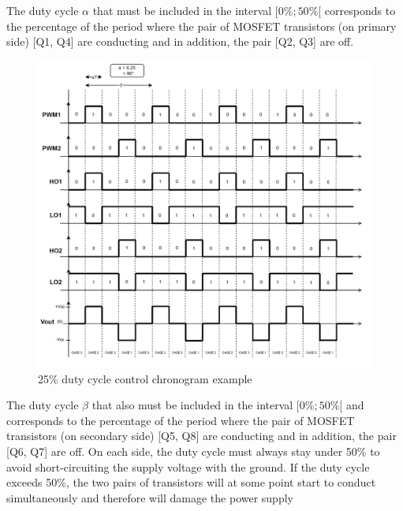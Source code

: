 \documentclass[conference]{IEEEtran}
\begin{document}
The duty cycle \( \alpha \) that must be included in the interval \([0\% ; 50\%[\) corresponds to the
percentage of the period where the pair of MOSFET transistors (on primary side) [Q1, Q4] are conducting and in addition, the pair [Q2, Q3] are off.

\begin{figure}[htbp]
	\centerline{\includegraphics[width=\linewidth]{images/2.png}}
	\caption{25\% duty cycle control chronogram example}
	\label{fig}
\end{figure}

The duty cycle \(\beta\) that also must be included in the interval \([0\% ; 50\%[\) and
corresponds to the percentage of the period where the pair of MOSFET transistors (on
secondary side) [Q5, Q8] are conducting and in addition, the pair [Q6, Q7] are off.
On each side, the duty cycle must always stay under 50\% to avoid short-circuiting the
supply voltage with the ground. If the duty cycle exceeds 50\%, the two pairs of transistors
will at some point start to conduct simultaneously and therefore will damage the power
supply
\end{document}
